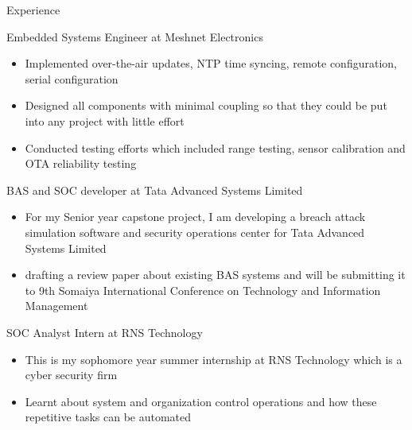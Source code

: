 \documentclass{article}
\newlength{\tabin}
\newlength{\secsep}
\newcommand{\lineunder}{\vspace*{-8pt} \\ \hspace*{-6pt} \hrulefill \\ \vspace*{-15pt}}
\newenvironment{tabbedsection}[1]{
	\begin{list}{}{
		\setlength{\itemsep}{0pt}
		\setlength{\labelsep}{0pt}
		\setlength{\labelwidth}{0pt}
		\setlength{\leftmargin}{\tabin}
		\setlength{\rightmargin}{\tabin}
		\setlength{\listparindent}{0pt}
		\setlength{\parsep}{0pt}
		\setlength{\parskip}{0pt}
		\setlength{\partopsep}{0pt}
		\setlength{\topsep}{#1}
	}
	\item[]
}{\end{list}}
\newenvironment{resume_section}[1]{
	\filbreak
	\vspace{2\secsep}
	\textsc{\large#1}
	\lineunder
	\begin{tabbedsection}{\secsep}
}{\end{tabbedsection}}
\newenvironment{resume_subsection}[2][]{
	\textbf{#2} \hfill {\footnotesize #1} \hspace{2em}
	\begin{tabbedsection}{0.5\secsep}
}{\end{tabbedsection}}
\newenvironment{subitems}{
	\renewcommand{\labelitemi}{-}
	\begin{itemize}
		\setlength{\labelsep}{1em}
}{\end{itemize}}
\begin{document}
\begin{resume_section}{Experience}

	\begin{resume_subsection}{Embedded Systems Engineer at Meshnet Electronics}
		\begin{subitems}
			\item   Implemented over-the-air updates, NTP time
				syncing, remote configuration, serial
				configuration
			\item   Designed all components with minimal coupling
				so that they could be put into any project with
				little effort
			\item   Conducted testing efforts which included range
				testing, sensor calibration and OTA reliability
				testing
		\end{subitems}
	\end{resume_subsection}

	\begin{resume_subsection}{BAS and SOC developer at Tata Advanced Systems Limited}
		\begin{subitems}
		\item For my Senior year capstone project, I am developing a
			breach attack simulation software and security
			operations center for Tata Advanced Systems Limited
		\item drafting a review paper about existing BAS systems and
			will be submitting it to 9th Somaiya International
			Conference on Technology and Information Management
		\end{subitems}
	\end{resume_subsection}

	\begin{resume_subsection}{SOC Analyst Intern at RNS Technology}
		\begin{subitems}
		\item This is my sophomore year summer internship at RNS Technology
			which is a cyber security firm
		\item Learnt about system and organization control operations and
			how these repetitive tasks can be automated
		\end{subitems}
	\end{resume_subsection}

\end{resume_section}
\end{document}
